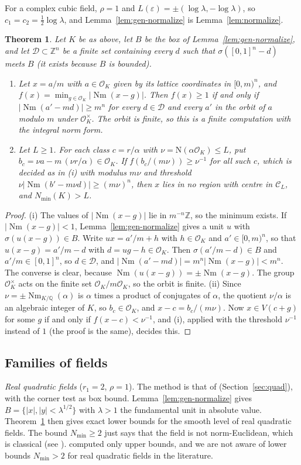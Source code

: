 \documentclass[11pt]{amsart}
\newtheorem{theorem}{Theorem}[section]
\theoremstyle{definition}
\theoremstyle{remark}
\numberwithin{equation}{section}
\newcommand{\Q}{\mathbb{Q}}
\newcommand{\Z}{\mathbb{Z}}
\newcommand{\cO}{\mathcal{O}}
\newcommand{\Nm}{\operatorname{Nm}}
\newcommand{\Nmin}{N_{\min}}
\begin{document}
For a complex cubic field, $\rho=1$ and $L(\varepsilon)=\pm(\log\lambda,-\log\lambda)$, so
$c_1=c_2=\frac12\log\lambda$, and Lemma~\ref{lem:gen-normalize} is Lemma~\ref{lem:normalize}.

\begin{theorem}\label{thm:gen-witness}
Let $K$ be as above, let $B$ be the box of Lemma~\ref{lem:gen-normalize}, and let
$\mathcal D\subset\Z^n$ be a finite set containing every $d$ such that $\sigma([0,1]^n-d)$ meets
$B$ (it exists because $B$ is bounded).
\begin{enumerate}
\item[(i)] Let $x=a/m$ with $a\in\cO_K$ given by its lattice coordinates in $[0,m)^n$, and
$f(x)=\min_{g\in\cO_K}|\Nm(x-g)|$. Then $f(x)\ge1$ if and only if $|\Nm(a'-md)|\ge m^n$ for every
$d\in\mathcal D$ and every $a'$ in the orbit of $a$ modulo $m$ under $\cO_K^\times$. The orbit is
finite, so this is a finite computation with the integral norm form.
\item[(ii)] Let $L\ge1$. For each class $c=r/\alpha$ with $\nu=\mathrm N(\alpha\cO_K)\le L$, put
$b_c=\nu a-m\,(\nu r/\alpha)\in\cO_K$. If $f(b_c/(m\nu))\ge\nu^{-1}$ for all such $c$, which is
decided as in (i) with modulus $m\nu$ and threshold $\nu|\Nm(b'-m\nu d)|\ge(m\nu)^n$, then
$x$ lies in no region with centre in $\mathcal C_L$, and $\Nmin(K)>L$.
\end{enumerate}
\end{theorem}

\begin{proof}
(i) The values of $|\Nm(x-g)|$ lie in $m^{-n}\Z$, so the minimum exists. If $|\Nm(x-g)|<1$,
Lemma~\ref{lem:gen-normalize} gives a unit $u$ with $\sigma(u(x-g))\in B$. Write
$ux=a'/m+h$ with $h\in\cO_K$ and $a'\in[0,m)^n$, so that $u(x-g)=a'/m-d$ with
$d=ug-h\in\cO_K$. Then $\sigma(a'/m-d)\in B$ and $a'/m\in[0,1]^n$, so $d\in\mathcal D$, and
$|\Nm(a'-md)|=m^n|\Nm(x-g)|<m^n$. The converse is clear, because $\Nm(u(x-g))=\pm\Nm(x-g)$. The
group $\cO_K^\times$ acts on the finite set $\cO_K/m\cO_K$, so the orbit is finite.
(ii) Since $\nu=\pm\Nm_{K/\Q}(\alpha)$ is $\alpha$ times a product of conjugates of $\alpha$, the
quotient $\nu/\alpha$ is an algebraic integer of $K$, so $b_c\in\cO_K$, and $x-c=b_c/(m\nu)$. Now
$x\in V(c+g)$ for some $g$ if and only if $f(x-c)<\nu^{-1}$, and (i), applied with the threshold
$\nu^{-1}$ instead of $1$ (the proof is the same), decides this.
\end{proof}

\subsection{Families of fields}
\emph{Real quadratic fields} ($r_1=2$, $\rho=1$). The method is that of \cite{GM}
(Section~\ref{sec:quad}), with the corner test as box bound. Lemma~\ref{lem:gen-normalize} gives
$B=\{|x|,|y|<\lambda^{1/2}\}$ with $\lambda>1$ the fundamental unit in absolute value.
Theorem~\ref{thm:gen-witness} then gives exact lower bounds for the smooth level of real
quadratic fields. The bound $\Nmin\ge2$ just says that the field is not norm-Euclidean, which
is classical (see \cite{Le,Lz}). \cite{GM} computed only upper bounds, and we are not aware of
lower bounds $\Nmin>2$ for real quadratic fields in the literature.
\end{document}
